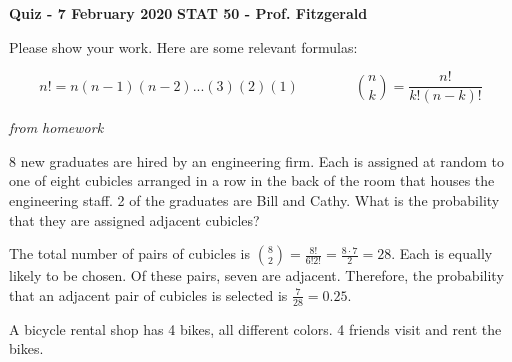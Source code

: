\documentclass[12pt, addpoints]{exam}
\begin{document}
\textbf{Quiz - 7 February 2020}
\hfill
\textbf{STAT 50 - Prof. Fitzgerald}

\vspace{10mm}
 

\vspace{5mm}

Please show your work. Here are some relevant formulas:

\[
n! = n (n-1) (n-2)... (3)(2)(1)
\qquad \qquad
\binom{n}{k} = \frac{n!}{k!(n-k)!}
\]

\begin{questions}

\question[5]

\emph{from homework}

8 new graduates are hired by an engineering firm.
Each is assigned at random to one of eight cubicles arranged in a row in the back of the room that houses the engineering staff.
2 of the graduates are Bill and Cathy.
What is the probability that they are assigned adjacent cubicles?

\begin{solution} 
The total number of pairs of cubicles is $\binom{8}{2} = \frac{8!}{6! 2!} = \frac{8 \cdot 7}{2} = 28$.
Each is equally likely to be chosen.
Of these pairs, seven are adjacent.
Therefore, the probability that an adjacent pair of cubicles is selected is $\frac{7}{28} = 0.25$.
\end{solution}


\question 

A bicycle rental shop has 4 bikes, all different colors.
4 friends visit and rent the bikes.

\end{questions}
\end{document}
